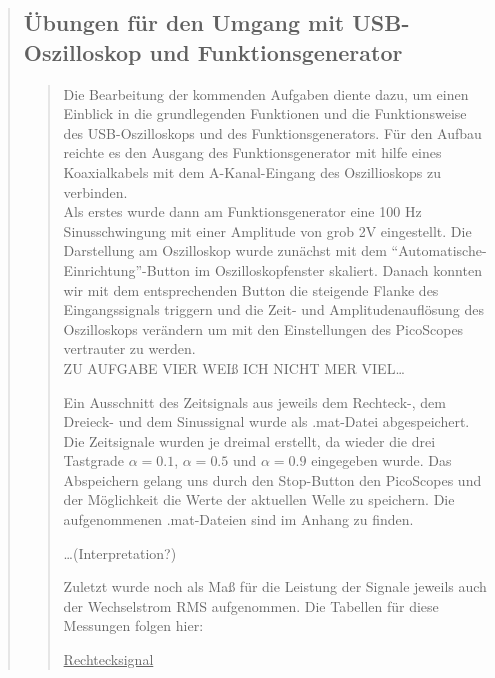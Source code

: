 \begin{quote}
\begin{quote}
\begin{center}
		\end{center}
		
	\end{quote}
	
	\subsection{Übungen für den Umgang mit USB-Oszilloskop und Funktionsgenerator}	
	\begin{quote}
	
	Die Bearbeitung der kommenden Aufgaben diente dazu, um einen Einblick in die
	grundlegenden Funktionen und die Funktionsweise des USB-Oszilloskops und des
	Funktionsgenerators. Für den Aufbau reichte es den Ausgang des
	Funktionsgenerator mit hilfe eines Koaxialkabels mit dem A-Kanal-Eingang des Oszillioskops 
	zu verbinden.\\
	
	Als erstes wurde dann am Funktionsgenerator eine 100 Hz
	Sinusschwingung mit einer Amplitude von grob 2V eingestellt. Die Darstellung am
	Oszilloskop wurde zunächst mit dem ``Automatische-Einrichtung''-Button im
	Oszilloskopfenster skaliert. Danach konnten wir mit dem entsprechenden Button
	die steigende Flanke des Eingangssignals triggern und die Zeit- und
	Amplitudenauflösung des Oszilloskops verändern um mit den Einstellungen des
	PicoScopes vertrauter zu werden.\\
	
	ZU AUFGABE VIER WEIß ICH NICHT MER VIEL\ldots
	
	Ein Ausschnitt des Zeitsignals aus jeweils dem Rechteck-, dem Dreieck- und dem
	Sinussignal wurde als .mat-Datei abgespeichert. Die Zeitsignale wurden je
	dreimal erstellt, da wieder die drei Tastgrade $\alpha = 0.1$, $\alpha =
	0.5$ und $\alpha = 0.9$ eingegeben wurde. Das Abspeichern gelang uns durch den
	Stop-Button den PicoScopes und der Möglichkeit die Werte der aktuellen Welle zu speichern. 
	Die aufgenommenen .mat-Dateien sind im Anhang zu finden.
	
	\ldots (Interpretation?)
	
	Zuletzt wurde noch als Maß für die Leistung der Signale jeweils auch der
	Wechselstrom RMS aufgenommen. Die Tabellen für diese Messungen folgen hier:
	
	\underline{Rechtecksignal}
		

\end{quote}
\end{quote}
